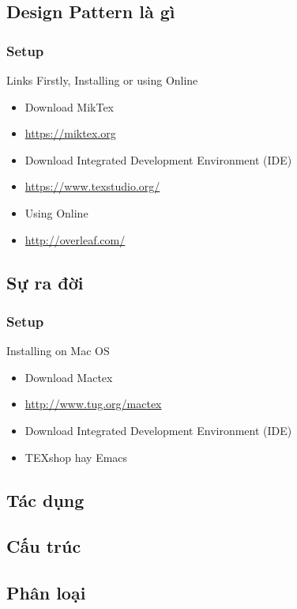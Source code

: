 \documentclass[english,10pt,table]{beamer}
\begin{document}
\subsection{Design Pattern là gì}
\frame
{
  \frametitle{Setup}	
\begin{block}{Links}
Firstly, Installing or using Online
\begin{itemize}
	\item Download MikTex 
	\item \url{https://miktex.org}
	\item Download Integrated Development Environment (IDE)
	\item \url{https://www.texstudio.org/}
	\item Using Online
	\item \url{http://overleaf.com/}
\end{itemize}
\end{block}
}

\subsection{Sự ra đời}
\frame
{
	\frametitle{Setup}
	\begin{block}{Installing on Mac OS}
		\begin{itemize}
			\item Download Mactex 
			\item \url{http://www.tug.org/mactex}
			\item Download Integrated Development Environment (IDE)
			\item TEXshop hay Emacs
		\end{itemize}
		
	\end{block}
}
\subsection{Tác dụng}
\subsection{Cấu trúc}
\subsection{Phân loại}
\end{document}
